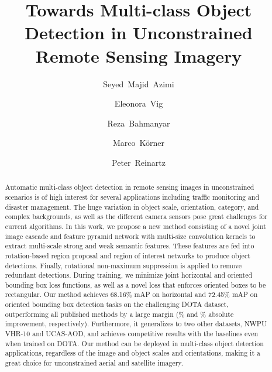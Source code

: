 \documentclass[runningheads]{llncs}
\begin{document}
\sloppy

\title{Towards Multi-class Object Detection in Unconstrained Remote Sensing Imagery}

\author{Seyed~Majid~Azimi \and
Eleonora~Vig \and
Reza~Bahmanyar \and
Marco~K\"orner \and
Peter~Reinartz}




\maketitle
\begin{abstract}
Automatic multi-class object detection in remote sensing images in unconstrained scenarios is of high interest for several applications including traffic monitoring and disaster management.
		The huge variation in object scale, orientation, category, and complex backgrounds, as well as the different camera sensors pose great challenges for current algorithms.
        In this work, we propose a new method consisting of a novel joint image cascade and feature pyramid network with multi-size convolution kernels to extract multi-scale strong and weak semantic features.
		These features are fed into rotation-based region proposal and region of interest networks to produce object detections.
        Finally, rotational non-maximum suppression is applied to remove redundant detections.
        During training, we minimize joint horizontal and oriented bounding box loss functions, as well as a novel loss that enforces oriented boxes to be rectangular.
		Our method achieves 68.16\% mAP on horizontal and 72.45\% mAP on oriented bounding box detection tasks on the challenging DOTA dataset, outperforming all published methods by a large margin (\% and \% absolute improvement, respectively).
        Furthermore, it generalizes to two other datasets, NWPU VHR-10 and UCAS-AOD, and achieves competitive results with the baselines even when trained on DOTA.
		Our method can be deployed in multi-class object detection applications, regardless of the image and object scales and orientations, making it a great choice for unconstrained aerial and satellite imagery.
\end{abstract}
\end{document}
